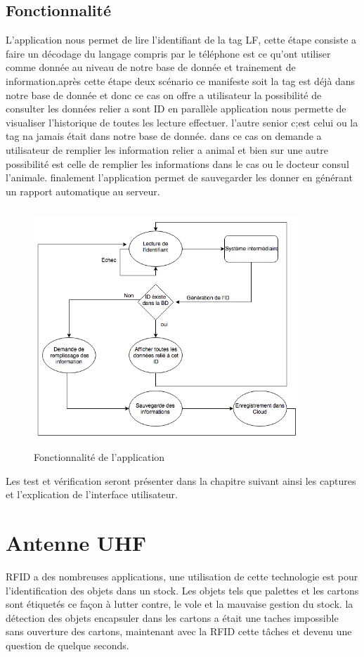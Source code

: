 \documentclass[11pt, a4paper, twoside]{book}
\begin{document}
\subsection{Fonctionnalité}
L'application nous permet de lire l'identifiant de la tag LF, cette étape consiste a faire un décodage du langage compris par le téléphone est ce qu'ont utiliser comme donnée au niveau de notre base de donnée et trainement de information.après cette étape deux scénario ce manifeste soit la tag est déjà dans notre base de donnée et donc ce cas on offre a utilisateur la possibilité de consulter les données relier a sont ID en parallèle application nous permette de visualiser l'historique de toutes les lecture effectuer. l'autre senior c;est celui ou la tag na jamais était dans notre base de donnée. dans ce cas on demande a utilisateur de remplier les information relier a animal et bien sur une autre possibilité est celle de remplier les informations dans le cas ou le docteur consul l'animale. finalement l'application permet de sauvegarder les donner en générant un rapport automatique au serveur.

\begin{figure}[H]
\centering
\includegraphics[width=10cm,height=9cm]{fonc}
\caption{Fonctionnalité de l'application}
\end{figure}
Les test et vérification seront présenter dans la chapitre suivant ainsi les captures et l'explication de l'interface utilisateur.

\section{Antenne UHF}
RFID a des nombreuses applications, une utilisation de cette technologie est pour l'identification des objets dans un stock. Les objets tels que palettes et les cartons sont étiquetés ce façon à lutter contre, le vole et la mauvaise gestion du stock. la détection des objets encapsuler dans les cartons a était une taches impossible sans ouverture des cartons, maintenant avec la RFID cette tâches et devenu une question de quelque seconds.
\end{document}
